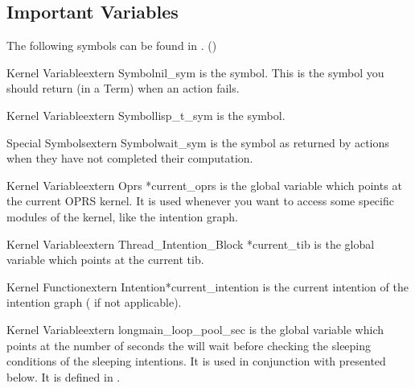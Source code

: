 \subsection{Important Variables}

The following symbols can be found in . ()

\begin{typevr}{Kernel Variable}{extern Symbol}{nil\_sym} is the 
symbol. This is the symbol you should return (in a Term) when an action
fails.
\end{typevr}

\begin{typevr}{Kernel Variable}{extern Symbol}{lisp\_t\_sym} is the 
symbol.
\end{typevr}

\begin{typevr}{Special Symbols}{extern Symbol}{wait\_sym}
is the  symbol as returned by actions when they have not completed
their computation.
\end{typevr}

\begin{typevr}{Kernel Variable}{extern Oprs *}{current\_oprs} is the global
variable which points at the current OPRS kernel. It is used whenever you
want to access some specific modules of the kernel, like the intention
graph.
\end{typevr}

\begin{typevr}{Kernel Variable}{extern Thread\_Intention\_Block *}{current\_tib} is the global
variable which points at the current tib.
\end{typevr}

\begin{typevr}{Kernel Function}{extern Intention*}{current\_intention} is the
current intention of the intention graph  ( if not applicable).
\end{typevr}

\begin{typevr}{Kernel Variable}{extern long}{main\_loop\_pool\_sec} is the global
variable which points at the number of seconds the \CPK{} will wait before
checking the sleeping conditions of the sleeping intentions. It is used in
conjunction with  presented below. It is defined
in .
\end{typevr}

